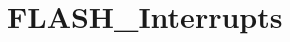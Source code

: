 \hypertarget{group___f_l_a_s_h___interrupts}{\section{F\-L\-A\-S\-H\-\_\-\-Interrupts}
\label{group___f_l_a_s_h___interrupts}
}
